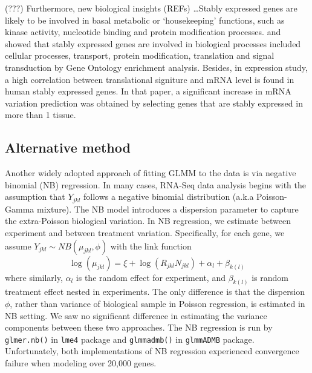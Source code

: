 \documentclass[11pt, a4paper]{article}
\begin{document}






(???) Furthermore, new biological insights (REFs) \dots Stably expressed genes
are likely to be involved in basal metabolic or ‘housekeeping’ functions, such
as  kinase activity, nucleotide binding and protein modification processes.
\cite{sekhon2011genome} and \cite{wang2010dynamic} showed that stably
expressed genes are involved in biological processes included cellular
processes, transport, protein modification, translation and signal
transduction by Gene Ontology enrichment analysis. Besides, in expression
study, a high correlation between translational signiture and mRNA level is
found in human stably expressed genes\citep{line2013translational}. In that
paper, a significant increase in mRNA variation prediction was obtained by
selecting genes that are stably expressed in more than 1 tissue.\\




  \subsection{Alternative method}
Another widely adopted approach of fitting GLMM to the data is via negative binomial (NB) regression. In many cases,  RNA-Seq data analysis begins with the assumption that $Y_{jkl}$ follows a negative binomial distribution (a.k.a Poisson-Gamma mixture). The NB model introduces a dispersion parameter to capture the extra-Poisson biological variation.  In NB regression, we estimate between experiment and between treatment variation. Specifically,  for each gene, we assume $Y_{jkl}\sim NB(\mu_{jkl}, \phi)$ with the link function
 \[\log(\mu_{jkl})= \xi + \log(R_{jkl}N_{jkl}) + \alpha_l + \beta_{k(l)}\]
where similarly, $\alpha_l$ is the random effect for experiment, and $\beta_{k(l)}$ is random treatment effect nested in experiments.  The only difference is that the dispersion $\phi$, rather than variance of biological sample in Poisson regression, is estimated in NB setting. We saw no significant difference in estimating the variance components between these two approaches. The NB regression is run by \verb"glmer.nb()" in \verb"lme4" package\citep{bates2012lme4} and \verb"glmmadmb()" in \verb"glmmADMB" package\citep{bolker2012getting}. Unfortunately, both implementations of NB regression experienced convergence failure when modeling over 20,000 genes. \\
\end{document}
